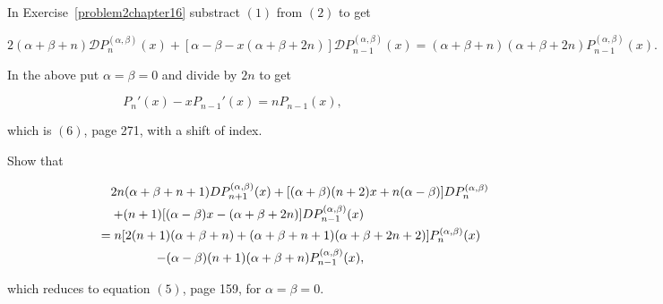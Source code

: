 \begin{solution}
In Exercise~\ref{problem2chapter16} substract $(1)$ from $(2)$ to get

$$2(\alpha+\beta+n) \mathscr{D}P_n^{(\alpha,\beta)}(x) + [\alpha-\beta-x(\alpha+\beta+2n)]\mathscr{D} P_{n-1}^{(\alpha,\beta)}(x) = (\alpha+\beta+n)(\alpha+\beta+2n) P_{n-1}^{(\alpha,\beta)}(x).$$

In the above put $\alpha=\beta=0$ and divide by $2n$ to get

$$P_n'(x) - xP_{n-1}'(x) = nP_{n-1}(x),$$

which is $(6)$, page 271, with a shift of index.
\end{solution}
\begin{problem}\label{problem4chapter16}
Show that

\begin{eqnarray*}
\lefteqn{\phantom{=}2n(\alpha+\beta+n+1)DP_{n+1}^{(\alpha,\beta)}(x) + [(\alpha+\beta)(n+2)x+n(\alpha-\beta)]DP_n^{(\alpha,\beta)}(x)} \\
&&+(n+1)[(\alpha-\beta)x-(\alpha+\beta+2n)]DP_{n-1}^{(\alpha,\beta)}(x) \\
\lefteqn{=n[2(n+1)(\alpha+\beta+n)+(\alpha+\beta+n+1)(\alpha+\beta+2n+2)]P_n^{(\alpha,\beta)}(x)} \\
&&-(\alpha-\beta)(n+1)(\alpha+\beta+n)P_{n-1}^{(\alpha,\beta)}(x),
\end{eqnarray*}

which reduces to equation $(5)$, page 159, for $\alpha=\beta=0$.
\end{problem}
